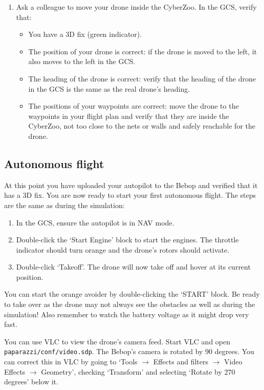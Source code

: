 \documentclass{article}
\begin{document}
\begin{enumerate}
\begin{enumerate}
\end{enumerate}
\item Ask a colleague to move your drone inside the CyberZoo. In the GCS, verify that:
\begin{itemize}
\item You have a 3D fix (green indicator).
\item The position of your drone is correct: if the drone is moved to the left, it also moves to the left in the GCS.
\item The heading of the drone is correct: verify that the heading of the drone in the GCS is the same as the real drone's heading.
\item The positions of your waypoints are correct: move the drone to the waypoints in your flight plan and verify that they are inside the CyberZoo, not too close to the nets or walls and safely reachable for the drone.
\end{itemize}
\end{enumerate}



\subsection*{Autonomous flight}
At this point you have uploaded your autopilot to the Bebop and verified that it has a 3D fix.
You are now ready to start your first autonomous flight.
The steps are the same as during the simulation:
\begin{enumerate}
\item In the GCS, ensure the autopilot is in NAV mode.
\item Double-click the `Start Engine' block to start the engines. The throttle indicator should turn orange and the drone's rotors should activate.
\item Double-click `Takeoff'. The drone will now take off and hover at its current position.
\end{enumerate}
You can start the orange avoider by double-clicking the `START' block. Be ready to take over as the drone may not always see the obstacles as well as during the simulation! Also remember to watch the battery voltage as it might drop very fast.


You can use VLC to view the drone's camera feed. Start VLC and open \verb"paparazzi/conf/video.sdp".
The Bebop's camera is rotated by 90 degrees. You can correct this in VLC by going to `Tools $\rightarrow$ Effects and filters $\rightarrow$ Video Effects $\rightarrow$ Geometry', checking `Transform' and selecting `Rotate by 270 degrees' below it.
\end{document}
